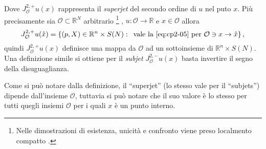 Dove $J_{\mathcal{O}}^{2,+}u(x)$ rappresenta il \emph{superjet} del secondo ordine di $u$ nel puto $x$. Più precisamente sia $\mathcal{O}\subset\mathbb{R}^N$ arbitrario%
\footnote{Nelle dimostrazioni di esistenza, unicità e confronto viene preso localmento compatto \cite[][10 §1]{crand:lion}.}
,  $u:\mathcal{O}\to\mathbb{R}$ e $\hat{x}\in\mathcal{O}$ allora
\[
J_{\mathcal{O}}^{2,+}u(\hat{x}) = \left\{(p,X)\in\mathbb{R}^n\times S(N):\,\text{ vale la \eqref{eq:cp2-05} per }\mathcal{O}\ni x\to\hat{x}\right\},
\]
quindi $J_{\mathcal{O}}^{2,+}u(x)$ definisce una mappa da $\mathcal{O}$ ad un sottoinsieme di $\mathbb{R}^n\times S(N)$. Una definizione simile si ottiene per il \emph{subjet} $J_{\mathcal{O}}^{2,-}u(x)$ basta invertire il segno della disuguaglianza.
\begin{osservazione}
Come si può notare dalla definizione, il ``superjet'' (lo stesso vale per il ``subjets'') dipende dall'insieme $\mathcal{O}$, tuttavia si può notare che il suo valore è lo stesso per tutti quegli insiemi $\mathcal{O}$ per i quali $x$ è un punto interno.  
\end{osservazione}

